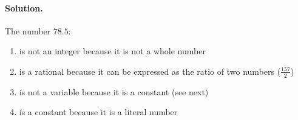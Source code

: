 
\paragraph{Solution.}

The number $78.5$:

\begin{enumerate}
    \item is not an integer because it is not a whole number
    \item is a rational because it can be expressed as the ratio of two numbers
        ($\frac{157}{2}$)
    \item is not a variable because it is a constant (see next)
    \item is a constant because it is a literal number
\end{enumerate}

